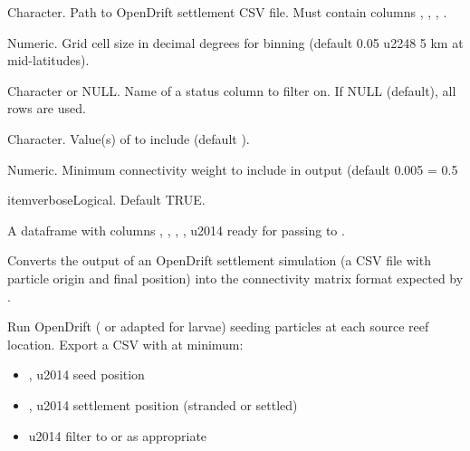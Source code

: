 \documentclass[a4paper]{book}
\begin{document}
\begin{Arguments}
\begin{ldescription}
\item[\code{opendrift\_csv}] Character. Path to OpenDrift settlement CSV file. Must
contain columns , , , .

\item[\code{bin\_deg}] Numeric. Grid cell size in decimal degrees for binning
(default 0.05 \bsl{}u2248 5 km at mid-latitudes).

\item[\code{status\_col}] Character or NULL. Name of a status column to filter on.
If NULL (default), all rows are used.

\item[\code{status\_keep}] Character. Value(s) of  to include
(default ).

\item[\code{min\_weight}] Numeric. Minimum connectivity weight to include in output
(default 0.005 = 0.5\bsl{}

\bsl{}itemverboseLogical. Default TRUE.

\end{ldescription}

A dataframe with columns , , ,
,  \bsl{}u2014 ready for passing to
.


Converts the output of an OpenDrift settlement simulation (a CSV file with
particle origin and final position) into the connectivity matrix format
expected by .

Run OpenDrift ( or  adapted for larvae) seeding particles
at each source reef location. Export a CSV with at minimum:
\begin{itemize}

\item{} ,  \bsl{}u2014 seed position
\item{} ,  \bsl{}u2014 settlement position (stranded or settled)
\item{}  \bsl{}u2014 filter to  or  as appropriate


\end{itemize}
\end{Arguments}
\end{document}
